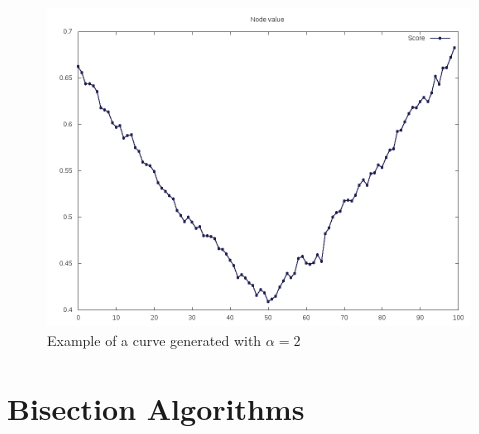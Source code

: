 \documentclass[12pt]{article}
\begin{document}
\begin{figure}[H]
\caption{Example of a curve generated with $\alpha = 2$}
\centering
\includegraphics[scale=.5]{alpha_two_curve}
\end{figure}

\newpage
\section{Bisection Algorithms}
\end{document}
